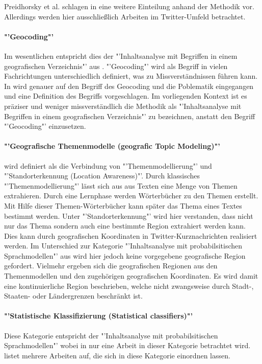 		Preidhorsky et al. schlagen in \cite{Priedhorsky2013} eine weitere Einteilung anhand der Methodik vor. 
		Allerdings werden hier ausschließlich Arbeiten im Twitter-Umfeld betrachtet. 

		\paragraph*{"'Geocoding"'} Im wesentlichen entspricht dies der "'Inhaltsanalyse mit Begriffen in einem geografischen Verzeichnis"' aus \cite{Cheng2010}. 
		"'Geocoding"' wird als Begriff in vielen Fachrichtungen unterschiedlich definiert, was zu Missverständnissen führen kann. 
		In \cite{bibsmaniaaa:Goldberg2008} wird genauer auf den Begriff des Geocoding und die Poblematik eingegangen und eine Definition  des Begriffs vorgeschlagen.
		Im vorliegenden Kontext ist es präziser und weniger missverständlich die Methodik als "'Inhaltsanalyse mit Begriffen in einem geografischen Verzeichnis"' zu bezeichnen, anstatt den Begriff "'Geocoding"' einzusetzen. 
		
		\paragraph*{"'Geografische Themenmodelle (geografic Topic Modeling)"'} wird definiert als die Verbindung von "'Themenmodellierung"' und "'Standorterkennung (Location Awareness)"'. 
		Durch klassisches "'Themenmodellierung"' lässt sich aus aus Texten eine Menge von Themen extrahieren. 
		Durch eine Lernphase werden Wörterbücher zu den Themen erstellt.
		Mit Hilfe dieser Themen-Wörterbücher kann später das Thema eines Textes bestimmt werden. \cite{Blei2012} 
		Unter "'Standorterkennung"' wird hier verstanden, dass nicht nur das Thema sondern auch eine bestimmte Region extrahiert werden kann. 
		Dies kann durch geografischen Koordinaten in Twitter-Kurznachrichten realisiert werden. 
		Im Unterschied zur Kategorie "'Inhaltsanalyse mit probabilsitischen Sprachmodellen"' aus \cite{Cheng2010} wird hier jedoch keine vorgegebene geografische Region gefordert. 
		Vielmehr ergeben sich die geografischen Regionen aus den Themenmodellen und den zugehörigen geografischen Koordinaten.
		Es wird damit eine kontinuierliche Region beschrieben, welche nicht zwangsweise durch Stadt-, Staaten- oder Ländergrenzen beschränkt ist.  

		\paragraph*{"'Statistische Klassifizierung (Statistical classifiers)"'} Diese Kategorie entspricht der "'Inhaltsanalyse mit probabilsitischen Sprachmodellen"' wobei in \cite{Cheng2010} nur eine Arbeit in dieser Kategorie betrachtet wird. \cite{Priedhorsky2013} listet mehrere Arbeiten auf, die sich in diese Kategorie einordnen lassen.   

